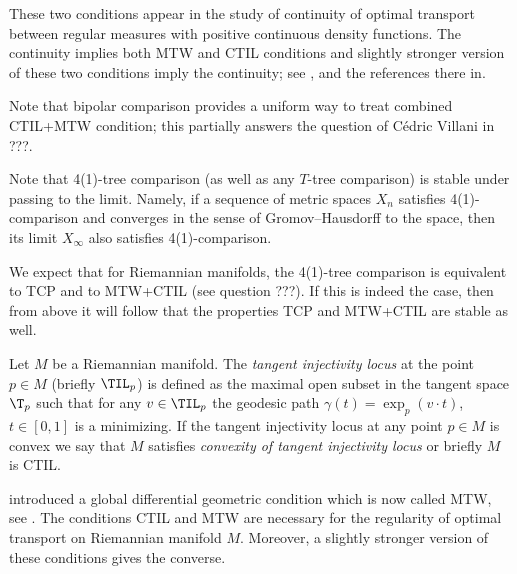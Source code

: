 These two conditions appear in the study of continuity of optimal transport between regular measures with positive continuous density functions.
The continuity implies both MTW and CTIL conditions and slightly stronger version of these two conditions imply the continuity;
see \cite{FRV-Nec+Suf}, \cite{MTW+CTIL} and the references there in.


Note that bipolar comparison provides a uniform way to treat combined CTIL+MTW condition;
this partially answers the question of Cédric Villani in ???.

Note that 4(1)-tree comparison (as well as any $T$-tree comparison) is stable under passing to the limit.
Namely, if a sequence of metric spaces $X_n$ satisfies 4(1)-comparison and converges in the sense of Gromov--Hausdorff to the space, then its limit $X_\infty$ also satisfies 4(1)-comparison.

We expect that for Riemannian manifolds, the 4(1)-tree comparison is equivalent to TCP and to MTW+CTIL (see question ???).
If this is indeed the case, then from above it will follow that the properties TCP and MTW+CTIL are stable as well.






















Let $M$ be a Riemannian manifold.
The \emph{tangent injectivity locus} at the point $p\in M$ (briefly $\TIL_p$) is defined as the maximal open subset in the tangent space $\T_p$ such that for any $v\in\TIL_p$ the geodesic path $\gamma(t)=\exp_p(v\cdot t)$, $t\in [0,1]$ is a minimizing.
If the tangent injectivity locus at any point $p\in M$ is convex we say that $M$ satisfies \emph{convexity of  tangent injectivity locus} or briefly $M$ is CTIL.

 introduced a global differential geometric condition which is now called MTW, see .
The conditions CTIL and MTW are necessary for the regularity of optimal transport on Riemannian manifold $M$.
Moreover, a slightly stronger version of these conditions gives the converse.












